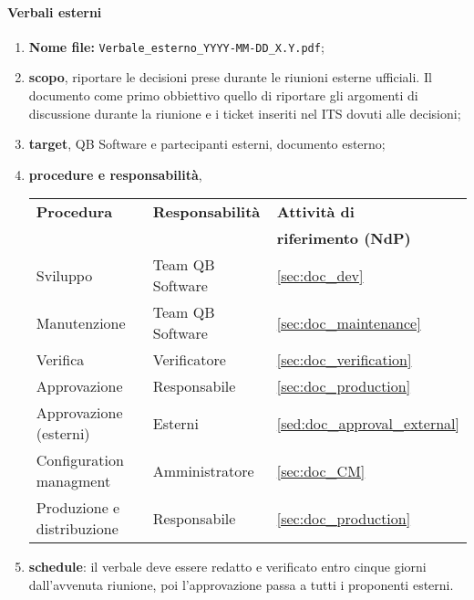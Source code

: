         \paragraph{Verbali esterni}
            \begin{enumerate}
                \item \textbf{Nome file:} \texttt{Verbale\_esterno\_YYYY-MM-DD\_X.Y.pdf};
                \item \textbf{scopo}, riportare le decisioni prese durante le riunioni esterne ufficiali. Il documento come primo obbiettivo quello di riportare gli argomenti di discussione durante la riunione e i ticket inseriti nel ITS dovuti alle decisioni;
                \item \textbf{target}, QB Software e partecipanti esterni, documento esterno;
                \item \textbf{procedure e responsabilità},
                \\
                \begin{tabularx}{0.93\textwidth}{|X|X|X|}
                    \hline
                    \textbf{Procedura} & \textbf{Responsabilità} & \textbf{Attività di} \\
                    & & \textbf{riferimento (NdP)} \\
                    \hline
                    Sviluppo & Team QB Software &  \ref{sec:doc_dev}
                    \\\hline
                    Manutenzione & Team QB Software & \ref{sec:doc_maintenance}
                    \\\hline
                    Verifica & Verificatore & \ref{sec:doc_verification}
                    \\\hline
                    Approvazione & Responsabile & \ref{sec:doc_production}
                    \\\hline
                    Approvazione (esterni) & Esterni & \ref{sed:doc_approval_external}
                    \\\hline
                    Configuration managment & Amministratore & \ref{sec:doc_CM}
                    \\\hline
                    Produzione e distribuzione & Responsabile & \ref{sec:doc_production}
                    \\\hline
                \end{tabularx}
                \item \textbf{schedule}: il verbale deve essere redatto e verificato entro cinque giorni dall'avvenuta riunione, poi l'approvazione passa a tutti i proponenti esterni.
            \end{enumerate} 

